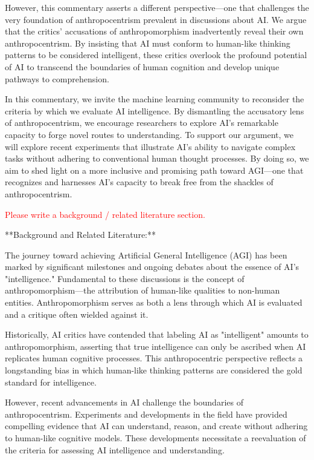\documentclass{article}
\begin{document}
However, this commentary asserts a different perspective—one that challenges the very foundation of anthropocentrism prevalent in discussions about AI. We argue that the critics' accusations of anthropomorphism inadvertently reveal their own anthropocentrism. By insisting that AI must conform to human-like thinking patterns to be considered intelligent, these critics overlook the profound potential of AI to transcend the boundaries of human cognition and develop unique pathways to comprehension.

In this commentary, we invite the machine learning community to reconsider the criteria by which we evaluate AI intelligence. By dismantling the accusatory lens of anthropocentrism, we encourage researchers to explore AI's remarkable capacity to forge novel routes to understanding. To support our argument, we will explore recent experiments that illustrate AI's ability to navigate complex tasks without adhering to conventional human thought processes. By doing so, we aim to shed light on a more inclusive and promising path toward AGI—one that recognizes and harnesses AI's capacity to break free from the shackles of anthropocentrism.

\textcolor{red}{Please write a background / related literature section.}

**Background and Related Literature:**

The journey toward achieving Artificial General Intelligence (AGI) has been marked by significant milestones and ongoing debates about the essence of AI's "intelligence." Fundamental to these discussions is the concept of anthropomorphism—the attribution of human-like qualities to non-human entities. Anthropomorphism serves as both a lens through which AI is evaluated and a critique often wielded against it.

Historically, AI critics have contended that labeling AI as "intelligent" amounts to anthropomorphism, asserting that true intelligence can only be ascribed when AI replicates human cognitive processes. This anthropocentric perspective reflects a longstanding bias in which human-like thinking patterns are considered the gold standard for intelligence.

However, recent advancements in AI challenge the boundaries of anthropocentrism. Experiments and developments in the field have provided compelling evidence that AI can understand, reason, and create without adhering to human-like cognitive models. These developments necessitate a reevaluation of the criteria for assessing AI intelligence and understanding.
\end{document}
